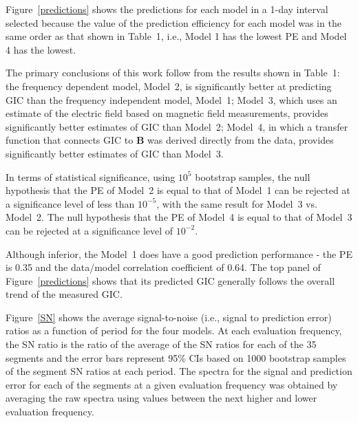 \documentclass[draft,linenumbers]{agujournal2018}
\begin{document}
Figure~\ref{predictions} shows the predictions for each model in a 1-day interval selected because the value of the prediction efficiency for each model was in the same order as that shown in Table~1, i.e., Model 1 has the lowest PE and Model 4 has the lowest.

The primary conclusions of this work follow from the results shown in Table~1: the frequency dependent model, Model~2, is significantly better at predicting GIC than the frequency independent model, Model~1; Model~3, which uses an estimate of the electric field based on magnetic field measurements, provides significantly better estimates of GIC than Model~2; Model~4, in which a transfer function that connects GIC to $\mathbf{B}$ was derived directly from the data, provides significantly better estimates of GIC than Model~3.

In terms of statistical significance, using $10^5$ bootstrap samples, the null hypothesis that the PE of Model~2 is equal to that of Model~1 can be rejected at a significance level of less than $10^{-5}$, with the same result for Model~3 vs. Model~2. The null hypothesis that the PE of Model~4 is equal to that of Model~3 can be rejected at a significance level of $10^{-2}$.

Although inferior, the Model~1 does have a good prediction performance - the PE is 0.35 and the data/model correlation coefficient of 0.64. The top panel of  Figure~\ref{predictions} shows that its predicted GIC generally follows the overall trend of the measured GIC. 


Figure~\ref{SN} shows the average signal-to-noise (i.e., signal to prediction error) ratios as a function of period for the four models. At each evaluation frequency, the SN ratio is the ratio of the average of the SN ratios for each of the 35 segments and the error bars represent 95\% CIs based on 1000 bootstrap samples of the segment SN ratios at each period. The spectra for the signal and prediction error for each of the segments at a given evaluation frequency was obtained by averaging the raw spectra using values between the next higher and lower evaluation frequency. 
\end{document}
